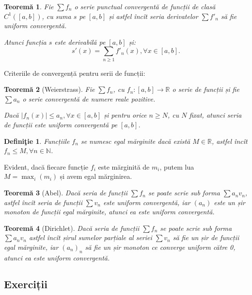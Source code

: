 \documentclass[11pt,a4paper]{article}
\newcommand\NN{\mathbb{N}}
\newcommand\RR{\mathbb{R}}
\theoremstyle{dotless}
\newtheorem{theorem}{Teorem\u{a}}[section]
\theoremstyle{dotlessdr}
\newtheorem{definition}{Defini\c{t}ie}[section]
\begin{document}
\begin{theorem}\label{thm:der-t}
  Fie $\sum f_n$ o serie punctual convergentă de funcții de clasă $C^1([a, b])$, cu suma
  $s$ pe $[a, b]$ și astfel încît seria derivatelor $\sum f'_n$ să fie uniform convergentă.

  Atunci funcția $s$ este derivabilă pe $[a, b]$ și:
  \[
    s'(x) = \sum_{n \geq 1} f'_n(x), \forall x \in [a, b].
  \]
\end{theorem}

Criteriile de convergență pentru serii de funcții:

\begin{theorem}[Weierstrass]\label{thm:wei-s-f}
  Fie $\sum f_n$, cu $f_n : [a, b] \to \RR$ o serie de funcții și fie $\sum a_n$ o serie
  convergentă de numere reale pozitive.

  Dacă $|f_n(x)| \leq a_n, \forall x \in [a, b]$ și pentru orice $n \geq N$, cu $N$ fixat,
  atunci seria de funcții este uniform convergentă pe $[a, b]$.
\end{theorem}

\begin{definition}\label{def:egal-m}
  Funcțiile $f_n$ se numesc \emph{egal mărginite} dacă există $M \in \RR$, astfel
  încît $f_n \leq M, \forall n \in \NN$.
\end{definition}

Evident, dacă fiecare funcție $f_i$ este mărginită de $m_i$, putem lua
$M = \max_i (m_i)$ și avem egal mărginirea.

\begin{theorem}[Abel]\label{thm:abel-s-f}
  Dacă seria de funcții $\sum f_n$ se poate scrie sub forma $\sum a_n v_n$, astfel
  încît seria de funcții $\sum v_n$ este uniform convergentă, iar $(a_n)$ este
  un șir monoton de funcții egal mărginite, atunci ea este uniform convergentă.
\end{theorem}

\begin{theorem}[Dirichlet]\label{thm:diri-s-f}
  Dacă seria de funcții $\sum f_n$ se poate scrie sub forma $\sum a_n v_n$
  astfel încît șirul sumelor parțiale al seriei $\sum v_n$ să fie un șir de funcții
  egal mărginite, iar $(a_n)_n$ să fie un șir monoton ce converge uniform către 0,
  atunci ea este uniform convergentă.
\end{theorem}


\subsection{Exerciții}
\label{subsec:exc-s-f}
\end{document}
